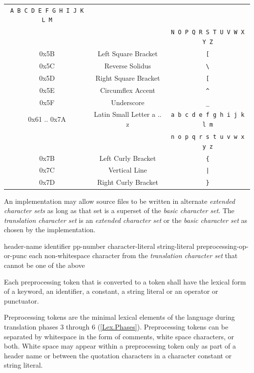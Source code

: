 \begin{center}
\begin{tabular}{|| c | c | c ||}
        \texttt{A B C D E F G H I J K L M}\\
    & & \texttt{N O P Q R S T U V W X Y Z}\\
    0x5B & Left Square Bracket & \texttt{[}\\
    0x5C & Reverse Solidus & \texttt{\textbackslash}\\
    0x5D & Right Square Bracket & \texttt{[}\\
    0x5E & Circumflex Accent & \texttt{\textasciicircum}\\
    0x5F & Underscore & \texttt{\_}\\
    0x61 .. 0x7A & Latin Small Letter a .. z &
        \texttt{a b c d e f g h i j k l m}\\
    & & \texttt{n o p q r s t u v w x y z}\\
    0x7B & Left Curly Bracket & \texttt{\{}\\
    0x7C & Vertical Line & \texttt{|}\\
    0x7D & Right Curly Bracket & \texttt{\}}\\
    \hline
  \end{tabular}
\end{center}

\p An implementation may allow source files to be written in alternate
\textit{extended character sets} as long as that set is a superset of the
\textit{basic character set}. The \textit{translation character set} is an
\textit{extended character set} or the \textit{basic character set} as chosen by
the implementation.


\begin{grammar}
  \br
  header-name\br
  identifier\br
  pp-number\br
  character-literal\br
  string-literal\br
  preprocessing-op-or-punc\br
  \textnormal{each non-whitespace character from the \textit{translation
  character set} that cannot be one of the above}
\end{grammar}

\p Each preprocessing token that is converted to a token shall have the lexical
form of a keyword, an identifier, a constant, a string literal or an operator or
punctuator.

\p Preprocessing tokens are the minimal lexical elements of the language during
translation phases 3 through 6 (\ref{Lex.Phases}). Preprocessing tokens can be
separated by whitespace in the form of comments, white space characters, or
both. White space may appear within a preprocessing token only as part of a
header name or between the quotation characters in a character constant or
string literal.


